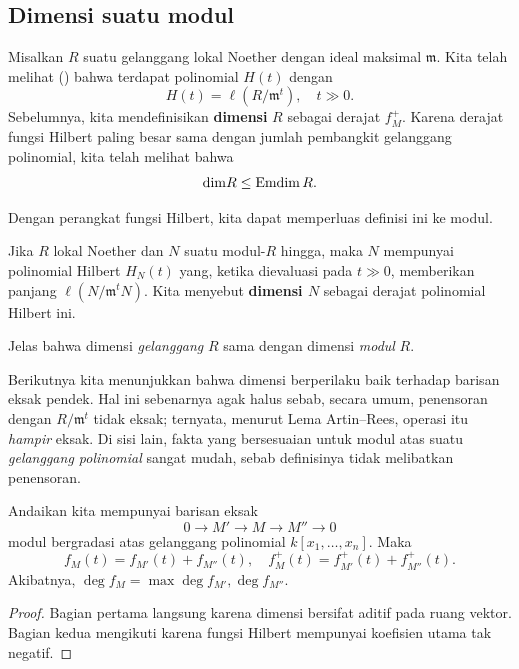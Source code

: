 \subsection{Dimensi suatu modul}
Misalkan $R $ suatu gelanggang lokal Noether dengan ideal maksimal $\mathfrak{m}$. Kita
telah melihat () bahwa terdapat polinomial $H(t)$ dengan
\[ H(t) = \ell(R/\mathfrak{m}^t), \quad t \gg 0.  \]
Sebelumnya, kita mendefinisikan \textbf{dimensi} $R$ sebagai derajat $f_M^+$. 
Karena derajat fungsi Hilbert paling besar sama dengan jumlah pembangkit
gelanggang polinomial, kita telah melihat bahwa 
\[ \mathrm{dim} R \leq \operatorname{Emdim} R.  \]

Dengan perangkat fungsi Hilbert, kita dapat memperluas
definisi ini ke modul.
\begin{definition} 
Jika $R$ lokal Noether dan $N$ suatu modul-$R$ hingga, maka $N$ mempunyai
polinomial Hilbert $H_N(t)$ yang, ketika dievaluasi pada $t \gg 0$, memberikan
panjang $\ell(N/\mathfrak{m}^t N)$.
Kita menyebut \textbf{dimensi
$N$} sebagai derajat polinomial Hilbert ini.
\end{definition} 

Jelas bahwa dimensi \emph{gelanggang} $R$ sama dengan dimensi
\emph{modul} $R$.

Berikutnya kita menunjukkan bahwa dimensi berperilaku baik terhadap barisan eksak
pendek. Hal ini sebenarnya agak halus sebab, secara umum, penensoran dengan
$R/\mathfrak{m}^t$ tidak eksak; ternyata, menurut Lema Artin--Rees, operasi itu \emph{hampir}
eksak. 
Di sisi lain, fakta yang bersesuaian untuk modul atas suatu \emph{gelanggang
polinomial} sangat mudah, sebab 
definisinya tidak melibatkan penensoran.

\begin{proposition} 
Andaikan kita mempunyai barisan eksak
\[ 0 \to M' \to M \to M'' \to 0 \]
modul bergradasi atas gelanggang polinomial $k[x_1, \dots, x_n]$.	Maka
\[ f_M(t) = f_{M'}(t) + f_{M''}(t), \quad  f_M^+(t) = f_{M'}^+(t) +
f_{M''}^+(t). \]
Akibatnya, $\deg f_M = \max \deg f_{M'}, \deg f_{M''}$.
\end{proposition} 
\begin{proof} Bagian pertama langsung karena dimensi bersifat aditif pada ruang
vektor. Bagian kedua mengikuti karena fungsi Hilbert mempunyai koefisien utama
tak negatif.
\end{proof} 

